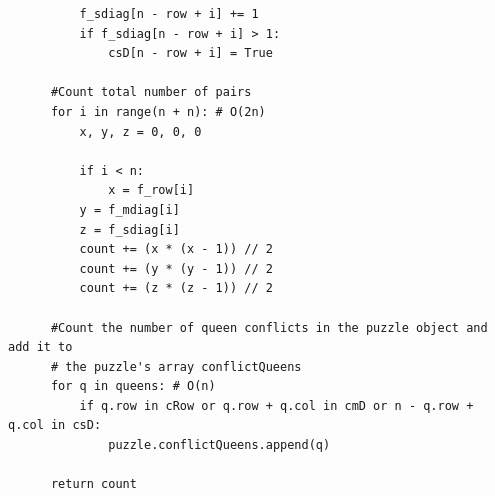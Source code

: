 \documentclass{article}
\begin{document}
\begin{verbatim}
          f_sdiag[n - row + i] += 1
          if f_sdiag[n - row + i] > 1:
              csD[n - row + i] = True
  
      #Count total number of pairs
      for i in range(n + n): # O(2n)
          x, y, z = 0, 0, 0
  
          if i < n:
              x = f_row[i]
          y = f_mdiag[i]
          z = f_sdiag[i]  
          count += (x * (x - 1)) // 2
          count += (y * (y - 1)) // 2
          count += (z * (z - 1)) // 2
  
      #Count the number of queen conflicts in the puzzle object and add it to
      # the puzzle's array conflictQueens
      for q in queens: # O(n)
          if q.row in cRow or q.row + q.col in cmD or n - q.row + q.col in csD:
              puzzle.conflictQueens.append(q)
  
      return count
   \end{verbatim}
\newpage
\end{document}
